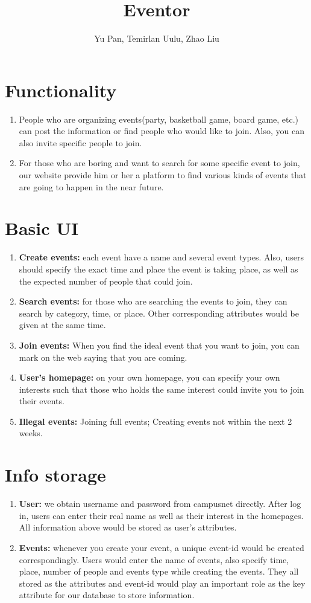 \documentclass{article}
\author{Yu Pan, Temirlan Uulu, Zhao Liu}
\title{Eventor}
\begin{document}
	\maketitle
	\section*{Functionality}
	\begin{enumerate}
		\item People who are organizing events(party, basketball game, board game, etc.) can post the information or find people who would like to join. Also, you can also invite specific people to join.
		\item For those who are boring and want to search for some specific event to join, our website provide him or her a platform to find various kinds of events that are going to happen in the near future.
	\end{enumerate}
	\section*{Basic UI}
	\begin{enumerate}
		\item \textbf{Create events:} each event have a name and several event types. Also, users should specify the exact time and  place the event is taking place, as well as the expected number of people that could join.
		\item \textbf{Search events:} for those who are searching the events to join, they can search by category, time, or place. Other corresponding attributes would be given at the same time.
		\item \textbf{Join events:} When you find the ideal event that you want to join, you can mark on the web saying that you are coming.
		\item \textbf{User's homepage:} on your own homepage, you can specify your own interests such that those who holds the same interest could invite you to join their events.
		\item \textbf{Illegal events:} Joining full events; Creating events not within the next 2 weeks.
	\end{enumerate}
	\section*{Info storage}
	\begin{enumerate}
		\item \textbf{User:} we obtain username and password from campusnet directly. After log in, users can enter their real name as well as their interest in the homepages. All information above would be stored as user's attributes.
		\item \textbf{Events:} whenever you create your event, a unique event-id would be created correspondingly. Users would enter the name of events, also specify time, place, number of people and events type while creating the events. They all stored as the attributes and event-id would play an important role as the key attribute for our database to store information.
	\end{enumerate}
\end{document}
